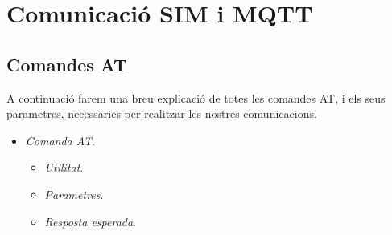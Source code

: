 \documentclass{tfgitic}[2024/07/01]
\begin{document}
\section{Comunicació SIM i MQTT}

\subsection*{Comandes AT}

A continuació farem una breu explicació de totes les comandes AT, i els seus parametres, necessaries per realitzar 
les nostres comunicacions.

\begin{itemize}
  \item \emph{Comanda AT}. 
  \begin{itemize}
    \item \emph{Utilitat}. 
    \item \emph{Parametres}. 
    \item \emph{Resposta esperada}. 
  \end{itemize} 
\end{itemize} 

\printbibliography
\end{document}
